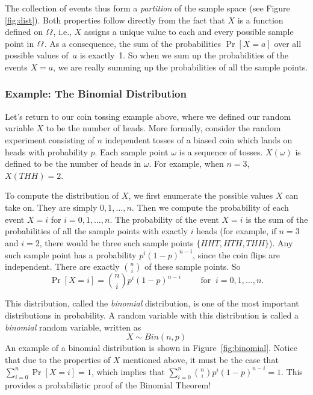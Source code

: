 \documentclass[11pt]{article}
\def\Omega{\mathchar"10A }
\def\Omega{\mathchar"10A }
\begin{document}
The collection of events thus form a {\it partition} of the sample space (see Figure \ref{fig:dist}).  Both properties follow directly from the fact that $X$ is a function defined on $\Omega$, i.e., $X$ assigns a unique value to each and every possible sample point in $\Omega$.
As a consequence, the sum of the probabilities $\Pr[X=a]$ over all possible
values of~$a$ is exactly~1. So when we sum up the
probabilities of the events $X=a$, we are really summing up the
probabilities of all the sample points.


\subsubsection*{Example: The Binomial Distribution}
Let's return to our coin tossing example above, where we defined our random variable $X$ to be the number of heads. More formally, consider the random experiment consisting of $n$ independent tosses of a biased coin which lands on heads with probability $p$. Each sample point $\omega$ is a sequence of tosses. $X(\omega)$ is defined to be the number of heads in $\omega$. For example, when $n = 3$, $X(THH) = 2$. 

To compute the distribution  of $X$, we first enumerate the possible values $X$ can take on. They are simply $0, 1, \ldots, n$. Then we compute the probability of each event $X=i$ for $i =0, 1, \ldots, n$. The probability of the event $X=i$ is the sum of the probabilities of all the sample points with exactly $i$ heads (for example, if $n=3$ and $i=2$, there would be three such sample points $\{HHT, HTH, THH\}$). Any such sample point has a probability $p^i(1-p)^{n-i}$, since the coin flips are independent. There are exactly $n \choose i$ of these sample points. So
\begin{equation}
\Pr[X=i] = {n \choose i} p^i(1-p)^{n-i} \qquad \text{ for } ~ i =0,1, \ldots, n.
\end{equation}

This distribution, called the {\it binomial\/} distribution, is one of the most important distributions in probability. 
A random variable with this distribution is called a {\it binomial\/} random variable, written as
$$X \sim Bin(n,p)$$
An example of a binomial distribution is shown in Figure~\ref{fig:binomial}. Notice that due  to the properties of $X$ mentioned above, it must be the case that $\sum_{i=0}^{n}\Pr[X=i] = 1$, which implies that
$\sum_{i=0}^{n}{n \choose i}p^i(1-p)^{n-i} = 1$.  This provides a probabilistic proof
of the Binomial Theorem!
\end{document}
